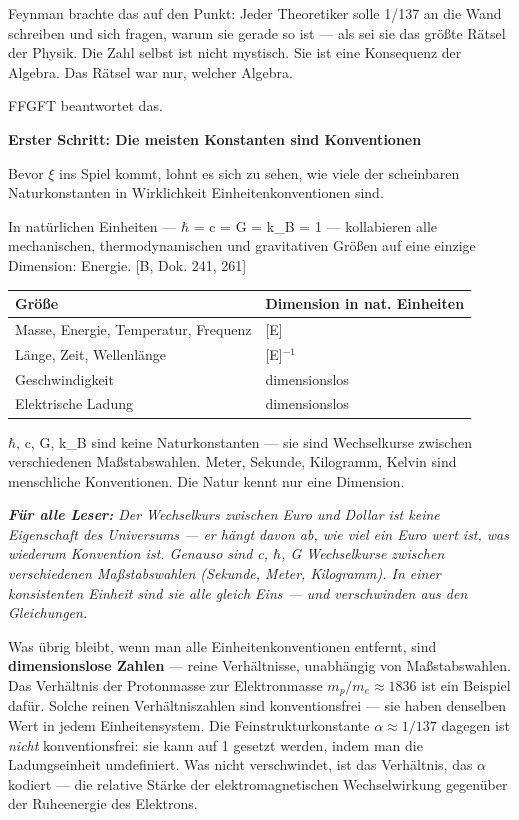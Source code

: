 \documentclass[11pt,oneside]{book}
\newenvironment{laierspur}{%
  \par\vspace{4pt}%
  \noindent\small\itshape\color{blue!60!black}%
  \textbf{Für alle Leser:}\enspace\ignorespaces}{%
  \par\vspace{4pt}\normalsize\normalfont\normalcolor}
\begin{document}
Feynman brachte das auf den Punkt: Jeder Theoretiker solle 1/137 an die Wand
schreiben und sich fragen, warum sie gerade so ist --- als sei sie das größte
Rätsel der Physik. Die Zahl selbst ist nicht mystisch. Sie ist eine Konsequenz
der Algebra. Das Rätsel war nur, welcher Algebra.


FFGFT beantwortet das.


\textbf{Erster Schritt: Die meisten Konstanten sind Konventionen}


Bevor $\xi$ ins Spiel kommt, lohnt es sich zu sehen, wie viele der scheinbaren
Naturkonstanten in Wirklichkeit Einheitenkonventionen sind.


In natürlichen Einheiten — $\hbar$ = c = G = k\_B = 1 — kollabieren alle
mechanischen, thermodynamischen und gravitativen Größen auf eine einzige
Dimension: Energie. [B, Dok. 241, 261]


\begin{center}
\small
\begin{tabular}{ll}
\toprule
Größe & Dimension in nat. Einheiten \\
\midrule
Masse, Energie, Temperatur, Frequenz & [E] \\
Länge, Zeit, Wellenlänge & [E]$^{-1}$ \\
Geschwindigkeit & dimensionslos \\
Elektrische Ladung & dimensionslos \\
\bottomrule
\end{tabular}
\end{center}

$\hbar$, c, G, k\_B sind keine Naturkonstanten — sie sind Wechselkurse zwischen
verschiedenen Maßstabswahlen. Meter, Sekunde, Kilogramm, Kelvin sind
menschliche Konventionen. Die Natur kennt nur eine Dimension.


\begin{laierspur}
Der Wechselkurs zwischen Euro und Dollar ist keine Eigenschaft
des Universums — er hängt davon ab, wie viel ein Euro wert ist, was wiederum
Konvention ist. Genauso sind c, $\hbar$, G Wechselkurse zwischen verschiedenen
Maßstabswahlen (Sekunde, Meter, Kilogramm). In einer konsistenten Einheit
sind sie alle gleich Eins — und verschwinden aus den Gleichungen.
\end{laierspur}

Was übrig bleibt, wenn man alle Einheitenkonventionen entfernt, sind
\textbf{dimensionslose Zahlen} — reine Verhältnisse, unabhängig von
Maßstabswahlen. Das Verhältnis der Protonmasse zur Elektronmasse $m_p/m_e \approx 1836$ ist
ein Beispiel dafür. Solche reinen Verhältniszahlen sind konventionsfrei —
sie haben denselben Wert in jedem Einheitensystem.
Die Feinstrukturkonstante $\alpha \approx 1/137$ dagegen ist
\textit{nicht} konventionsfrei: sie kann auf 1 gesetzt werden, indem man
die Ladungseinheit umdefiniert. Was nicht verschwindet, ist das Verhältnis,
das $\alpha$ kodiert — die relative Stärke der elektromagnetischen
Wechselwirkung gegenüber der Ruheenergie des Elektrons.
\end{document}
